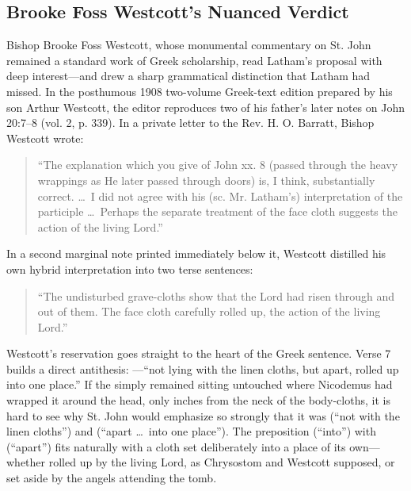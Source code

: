 \subsection{Brooke Foss Westcott's Nuanced Verdict}

Bishop Brooke Foss Westcott, whose monumental commentary on St. John remained a standard work of Greek scholarship, read Latham's proposal with deep interest---and drew a sharp grammatical distinction that Latham had missed. In the posthumous 1908 two-volume Greek-text edition prepared by his son Arthur Westcott, the editor reproduces two of his father's later notes on John 20:7--8 (vol. 2, p. 339). In a private letter to the Rev. H. O. Barratt, Bishop Westcott wrote:
\begin{quote}
``The explanation which you give of John xx. 8 (passed through the heavy wrappings as He later passed through doors) is, I think, substantially correct. \dots\ I did not agree with his (sc. Mr. Latham's) interpretation of the participle \dots\ Perhaps the separate treatment of the face cloth suggests the action of the living Lord.''
\end{quote}
In a second marginal note printed immediately below it, Westcott distilled his own hybrid interpretation into two terse sentences:
\begin{quote}
``The undisturbed grave-cloths show that the Lord had risen through and out of them. The face cloth carefully rolled up, the action of the living Lord.''
\end{quote}

Westcott's reservation goes straight to the heart of the Greek sentence. Verse 7 builds a direct antithesis: ---``not lying with the linen cloths, but apart, rolled up into one place.'' If the  simply remained sitting untouched where Nicodemus had wrapped it around the head, only inches from the neck of the body-cloths, it is hard to see why St. John would emphasize so strongly that it was  (``not with the linen cloths'') and  (``apart \dots\ into one place''). The preposition  (``into'') with  (``apart'') fits naturally with a cloth set deliberately into a place of its own---whether rolled up by the living Lord, as Chrysostom and Westcott supposed, or set aside by the angels attending the tomb.


